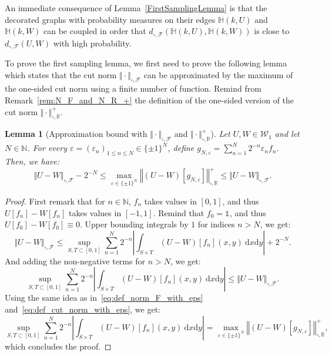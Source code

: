 \documentclass{amsart}
\theoremstyle{plain}
\newtheorem{lemme}[Th]{Lemma}
\theoremstyle{definition}
\newcommand{\Graphon}{\mathcal{W}_1}
\newcommand{\NcutRposLarge}[1]{\left\Vert#1\right\Vert_{\square,\R}^+}
\newcommand{\NcutRposSymbol}{\Vert\cdot\Vert_{\square,\R}^+}
\newcommand{\dcutF}{d_{\square,\mathcal{F}}}
\newcommand{\NcutF}[1]{\Vert#1\Vert_{\square,\mathcal{F}}}
\newcommand{\NcutFSymbol}{\Vert\cdot\Vert_{\square,\mathcal{F}}}
\newcommand{\un}{\mathds{1}}
\newcommand{\N}{\mathbb{N}}
\newcommand{\R}{\mathbb{R}}
\newcommand{\drv}{\mathrm{d}}
\newcommand{\eps}{\varepsilon}
\begin{document}
An immediate consequence of Lemma~\ref{FirstSamplingLemma}
is that the decorated graphs with probability measures on their edges
$\mathbb{H}(k,U)$ and $\mathbb{H}(k,W)$
can be coupled in order that
$\dcutF(\mathbb{H}(k,U),\mathbb{H}(k,W))$ 
is close to $\dcutF(U,W)$ with high probability.

To prove the first sampling lemma,
we first need to prove the following lemma
which states that the cut norm $\NcutFSymbol$
can be approximated by the maximum
of the one-sided cut norm using a finite number of function.
Remind from Remark~\ref{rem:N_F_and_N_R_+}
the definition of  the one-sided version of the cut norm $\NcutRposSymbol$.

\begin{lemme}[Approximation bound with $\NcutFSymbol$ and $\NcutRposSymbol$]
	\label{lemma_approx_cut_norm_with_eps}
Let $U,W\in\Graphon$ and let $N\in\N$.
For every $\eps=(\eps_n)_{1\leq n \leq N}\in \{ \pm 1 \}^N$,
define $g_{N,\eps} = \sum_{n=1}^N 2^{-n} \eps_n f_n$.
Then, we have:
\begin{equation*}
\NcutF{U-W} - 2^{-N}
\leq
\max_{\eps\in \{\pm 1\}^N} 
	\NcutRposLarge{(U-W)\left[ g_{N,\eps} \right]}
\leq \NcutF{U-W} .
\end{equation*}
\end{lemme}

\begin{proof}
First remark that for $n\in\N$, $f_n$ takes values in $[0,1]$,
and thus $U[f_n]-W[f_n]$ takes values in $[-1,1]$.
Remind that $f_0 = \un$, and thus $U[f_0]-W[f_0] \equiv 0$.
Upper bounding integrals by $1$ for indices $n>N$, we get:
\begin{equation*}
\NcutF{U-W}
\leq
\sup_{S,T \subset [0,1]} \sum_{n=1}^N 2^{-n}
		\left\vert \int_{S\times T} (U-W)[f_n](x,y)\ \drv x\drv y \right\vert
+ 2^{-N}.
\end{equation*}
And adding the non-negative terms for $n>N$, we get:
\begin{equation*}
\sup_{S,T \subset [0,1]} \sum_{n=1}^N 2^{-n}
		\left\vert \int_{S\times T} (U-W)[f_n](x,y)\ \drv x\drv y \right\vert
\leq \NcutF{U-W}.
\end{equation*}
Using the same idea as in~\eqref{eq:def_norm_F_with_eps}
and~\eqref{eq:def_cut_norm_with_eps}, we get:
\begin{equation*}
\sup_{S,T \subset [0,1]} \sum_{n=1}^N 2^{-n}
		\left\vert \int_{S\times T} (U-W)[f_n](x,y)\ \drv x\drv y \right\vert
= \max_{\eps\in \{\pm 1\}^N} 
	\NcutRposLarge{(U-W)\left[ g_{N,\eps} \right]},
\end{equation*}
which concludes the proof.
\end{proof}
\end{document}
